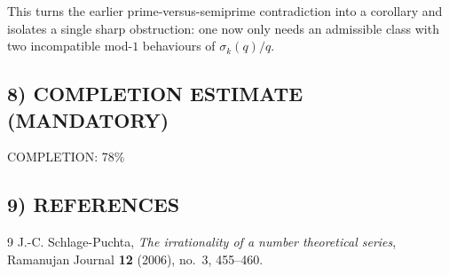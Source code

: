 \medskip
\noindent
This turns the earlier prime-versus-semiprime contradiction into a corollary and isolates a single sharp obstruction: one now only needs an admissible class with two incompatible mod-$1$ behaviours of $\sigma_k(q)/q$.

\subsection*{8) COMPLETION ESTIMATE (MANDATORY)}
COMPLETION: 78\%

\subsection*{9) REFERENCES}
\begin{thebibliography}{9}
J.-C. Schlage-Puchta,
\emph{The irrationality of a number theoretical series},
Ramanujan Journal \textbf{12} (2006), no.~3, 455--460.
\end{thebibliography}
